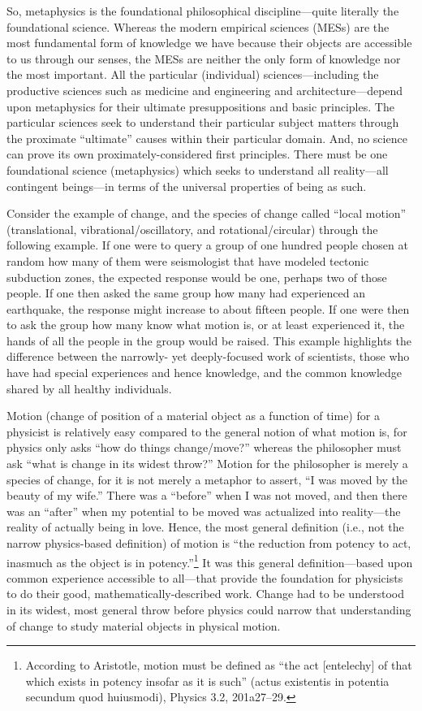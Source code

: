 So, metaphysics is the foundational philosophical discipline—quite literally the foundational science. Whereas the modern empirical sciences (MESs) are the most fundamental form of knowledge we have because their objects are accessible to us through our senses, the MESs are neither the only form of knowledge nor the most important. All the particular (individual) sciences—including the productive sciences such as medicine and engineering and architecture—depend upon metaphysics for their ultimate presuppositions and basic principles. The particular sciences seek to understand their particular subject matters through the proximate “ultimate” causes within their particular domain. And, no science can prove its own proximately-considered first principles. There must be one foundational science (metaphysics) which seeks to understand all reality—all contingent beings—in terms of the universal properties of being as such.

Consider the example of change, and the species of change called “local motion” (translational, vibrational/oscillatory, and rotational/circular) through the following example. If one were to query a group of one hundred people chosen at random how many of them were seismologist that have modeled tectonic subduction zones, the expected response would be one, perhaps two of those people. If one then asked the same group how many had experienced an earthquake, the response might increase to about fifteen people. If one were then to ask the group how many know what motion is, or at least experienced it, the hands of all the people in the group would be raised. This example highlights the difference between the narrowly- yet deeply-focused work of scientists, those who have had special experiences and hence knowledge, and the common knowledge shared by all healthy individuals.

Motion (change of position of a material object as a function of time) for a physicist is relatively easy compared to the general notion of what motion is, for physics only asks “how do things change/move?” whereas the philosopher must ask “what is change in its widest throw?” Motion for the philosopher is merely a species of change, for it is not merely a metaphor to assert, “I was moved by the beauty of my wife.” There was a “before” when I was not moved, and then there was an “after” when my potential to be moved was actualized into reality—the reality of actually being in love. Hence, the most general definition (i.e., not the narrow physics-based definition) of motion is “the reduction from potency to act, inasmuch as the object is in potency.”\footnote{According to Aristotle, motion must be defined as “the act [entelechy] of that which exists in potency insofar as it is such” (actus existentis in potentia secundum quod huiusmodi), Physics 3.2, 201a27–29.} It was this general definition—based upon common experience accessible to all—that provide the foundation for physicists to do their good, mathematically-described work. Change had to be understood in its widest, most general throw before physics could narrow that understanding of change to study material objects in physical motion.

